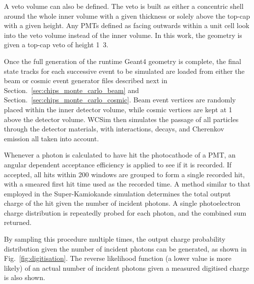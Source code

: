A veto volume can also be defined. The veto is built as either a concentric shell around the whole
inner volume with a given thickness or solely above the top-cap with a given height. Any PMTs
defined as facing outwards within a unit cell look into the veto volume instead of the inner
volume. In this work, the \chipsfive geometry is given a top-cap veto of height
\unit{1.3}{}.

Once the full generation of the runtime Geant4 geometry is complete, the final state tracks for
each successive event to be simulated are loaded from either the beam or cosmic event generator
files described next in Section.~\ref{sec:chips_monte_carlo_beam} and
Section.~\ref{sec:chips_monte_carlo_cosmic}. Beam event vertices are randomly placed within the
inner detector volume, while cosmic vertices are kept at \unit{1}{} above the detector
volume. WCSim then simulates the passage of all particles through the detector materials, with
interactions, decays, and Cherenkov emission all taken into account.

Whenever a photon is calculated to have hit the photocathode of a PMT, an angular dependent
acceptance efficiency is applied to see if it is recorded. If accepted, all hits within
\unit{200}{} windows are grouped to form a single recorded hit, with a smeared first
hit time used as the recorded time. A method similar to that employed in the Super-Kamiokande
simulation determines the total output charge of the hit given the number of incident photons. A
single photoelectron charge distribution is repeatedly probed for each photon, and the combined
sum returned.

By sampling this procedure multiple times, the output charge probability distribution given the
number of incident photons can be generated, as shown in Fig.~\ref{fig:digitisation}. The reverse
likelihood function (a lower value is more likely) of an actual number of incident photons given a
measured digitised charge is also shown.

